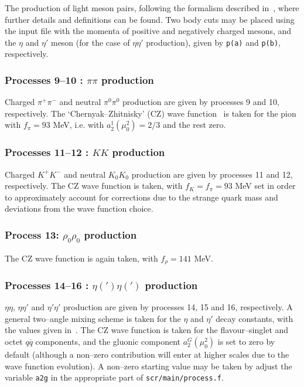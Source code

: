 \documentclass[12pt]{article}
\begin{document}
The production of light meson pairs, following the formalism described in~\cite{HarlandLang:2011qd,Harland-Lang:2013ncy}, where further details and 
definitions can be found. Two body cuts may be placed using the input file with the momenta of  positive and negatively charged mesons, and the 
$\eta$ and $\eta'$ meson (for the case of $\eta\eta'$ production), given by  \texttt{p(a)} and \texttt{p(b)}, respectively.

\subsubsection{Processes 9--10 : $\pi\pi$ production}

Charged $\pi^+\pi^-$ and neutral $\pi^0\pi^0$ production are given by processes 9 and 10, respectively. The `Chernyak--Zhitnisky' (CZ) wave 
function~\cite{Chernyak:1981zz} is taken for the pion with $f_\pi=93$ MeV, i.e. with $a_2^1(\mu_0^2)=2/3$ and the rest zero.

\subsubsection{Processes 11--12 : $KK$ production}

 Charged $K^+K^-$ and neutral $K_0K_0$ production are given by processes 11 and 12, respectively. The CZ wave function is taken, with 
 $f_K=f_\pi=93$ MeV set in order to approximately account for corrections due to the strange quark mass and deviations from the wave function choice.
 
 \subsubsection{Process 13: $\rho_0\rho_0$ production}
 
 The CZ wave function is again taken, with $f_\rho=141$ MeV.
 
 \subsubsection{Processes 14--16 : $\eta(')\eta(')$ production}

$\eta\eta$, $\eta\eta'$ and $\eta'\eta'$ production are given by processes 14, 15 and 16, respectively. A general two--angle mixing scheme is 
taken for the $\eta$ and $\eta'$ decay constants, with the values given in~\cite{Harland-Lang:2013ncy}. The CZ wave function is taken for the 
flavour--singlet and octet $q\overline{q}$ components, and the gluonic component $a_2^G(\mu_0^2)$ is set to zero by default (although a non--zero 
contribution will enter at higher scales due to the wave function evolution). A non--zero starting value may be taken by adjust the variable 
\texttt{a2g} in the appropriate part of \texttt{scr/main/process.f}.
\end{document}
